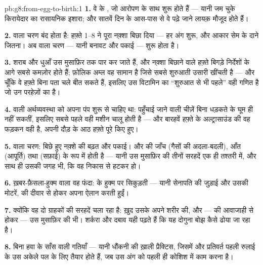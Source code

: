 \begin{solution}{pb:g8:from-egg-to-birth:1}
\textbf{1.} वे  के , जो आरोपण के साथ शुरू होते हैं ---
यानी जम चुके किरायेदार का रासायनिक इशारा; और सातवें दिन के आस-पास से वे
पढ़े जाने लायक़ मौजूद होते हैं।

\textbf{2.}  वाला चरण बंद होता है: हफ़्ते 1--8 ने पूरा नक़्शा बिछा
दिया --- हर अंग शुरू, और आकार सेम के दाने जितना। अब  वाला
चरण --- यानी बनावट और पकाई --- शुरू होता है।

\textbf{3.} शराब और धुआँ उस मुसाफ़िर तक पार कर जाते हैं, और नक़्शा
बिछाने वाले हफ़्ते बिगड़े निर्देशों के आगे सबसे कमज़ोर होते हैं; फ़ोलिक
अम्ल वह सामान है जिसे सबसे शुरुआती उसारी खींचती है --- और चूँकि वे
हफ़्ते बिना पता चले बीत सकते हैं, इसलिए उस विटामिन का ``शुरुआत से भी
पहले'' वही गणित है जो उन परहेज़ों का है।

\textbf{4.}  वाली अर्थव्यवस्था को अपना पंप शुरू से चाहिए था:
पहुँचाई जाने वाली चीज़ें बिना धड़कते  के घूम ही नहीं सकतीं, इसलिए
सबसे पहले वही मशीन चालू होती है --- और बारहवें हफ़्ते के अल्ट्रासाउंड
की वह फड़कन वही है, अपनी दौड़ के आठ हफ़्ते पूरे किए हुए।

\textbf{5.}  वाला चरण: बिछे हुए नक़्शे की बढ़त और पकाई। और
 की जाँच  (गैसों की अदला-बदली), आँत (आपूर्ति) तथा 
(सफ़ाई) के रूप में होती है --- यानी उस मुसाफ़िर की तीनों सरहदें एक ही
तश्तरी में, और साथ ही उसकी जगह भी, कि वह निकास से हटकर हो।

\textbf{6.} ख़बर-फ़ैसला-हुक्म वाला वह फंदा:  के हुक्म पर सिकुड़ती
 --- यानी सेनापति की जुड़ाई और उसकी मोटरें,  की दीवार से
होकर अपना ऐलान करती हुईं।

\textbf{7.} क्योंकि वह दो ग्राहकों की सरहदें चला रहा है: ख़ुद उसके अपने
शरीर की, और ---  की आवाजाही से होकर --- उस मुसाफ़िर की भी। शर्करा और
दबाव यही पढ़ते हैं कि यह दोगुना बोझ कैसे ढोया जा रहा है।

\textbf{8.} बिना हवा के साँस वाली गतियाँ --- यानी धौंकनी की ख़ाली
प्रैक्टिस, जिसमें  और प्रतिवर्त पहली रुलाई के उस अकेले पल के लिए
तैयार होते हैं, जब उस अंग को पहली ही कोशिश में काम करना है।


\end{solution}
